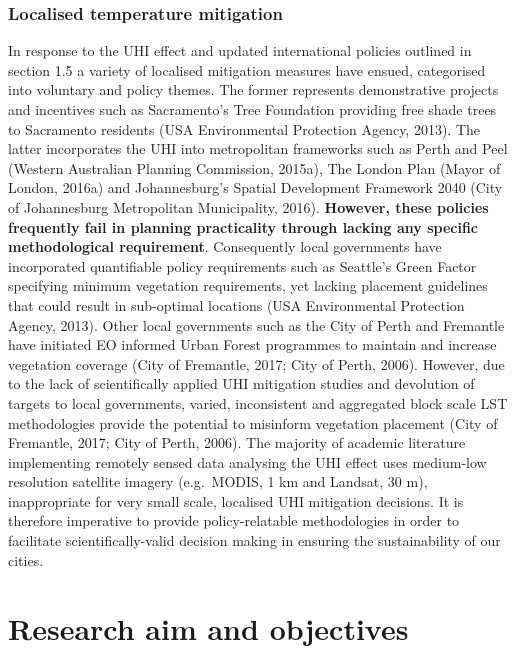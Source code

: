 \documentclass[]{book}
\begin{document}
\subsection{Localised temperature
mitigation}\label{localised-temperature-mitigation}

In response to the UHI effect and updated international policies
outlined in section 1.5 a variety of localised mitigation measures have
ensued, categorised into voluntary and policy themes. The former
represents demonstrative projects and incentives such as Sacramento's
Tree Foundation providing free shade trees to Sacramento residents (USA
Environmental Protection Agency, 2013). The latter incorporates the UHI
into metropolitan frameworks such as Perth and Peel \citet{3.5million}
(Western Australian Planning Commission, 2015a), The London Plan (Mayor
of London, 2016a) and Johannesburg's Spatial Development Framework 2040
(City of Johannesburg Metropolitan Municipality, 2016). \textbf{However,
these policies frequently fail in planning practicality through lacking
any specific methodological requirement}. Consequently local governments
have incorporated quantifiable policy requirements such as Seattle's
Green Factor specifying minimum vegetation requirements, yet lacking
placement guidelines that could result in sub-optimal locations (USA
Environmental Protection Agency, 2013). Other local governments such as
the City of Perth and Fremantle have initiated EO informed Urban Forest
programmes to maintain and increase vegetation coverage (City of
Fremantle, 2017; City of Perth, 2006). However, due to the lack of
scientifically applied UHI mitigation studies and devolution of targets
to local governments, varied, inconsistent and aggregated block scale
LST methodologies provide the potential to misinform vegetation
placement (City of Fremantle, 2017; City of Perth, 2006). The majority
of academic literature implementing remotely sensed data analysing the
UHI effect uses medium-low resolution satellite imagery (e.g.~MODIS, 1
km and Landsat, 30 m), inappropriate for very small scale, localised UHI
mitigation decisions. It is therefore imperative to provide
policy-relatable methodologies in order to facilitate
scientifically-valid decision making in ensuring the sustainability of
our cities.

\chapter{Research aim and objectives}\label{research-aim-and-objectives}
\end{document}
